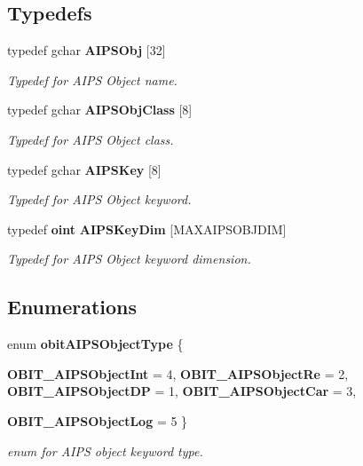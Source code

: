 \subsection*{Typedefs}
\begin{CompactItemize}
\item 
typedef gchar {\bf AIPSObj} [32]
\begin{CompactList}\small\item\em Typedef for AIPS Object name. \item\end{CompactList}\item 
typedef gchar {\bf AIPSObj\-Class} [8]
\begin{CompactList}\small\item\em Typedef for AIPS Object class. \item\end{CompactList}\item 
typedef gchar {\bf AIPSKey} [8]
\begin{CompactList}\small\item\em Typedef for AIPS Object keyword. \item\end{CompactList}\item 
typedef {\bf oint} {\bf AIPSKey\-Dim} [MAXAIPSOBJDIM]
\begin{CompactList}\small\item\em Typedef for AIPS Object keyword dimension. \item\end{CompactList}\end{CompactItemize}
\subsection*{Enumerations}
\begin{CompactItemize}
\item 
enum {\bf obit\-AIPSObject\-Type} \{ \par
{\bf OBIT\_\-AIPSObject\-Int} =  4, 
{\bf OBIT\_\-AIPSObject\-Re} =  2, 
{\bf OBIT\_\-AIPSObject\-DP} =  1, 
{\bf OBIT\_\-AIPSObject\-Car} =  3, 
\par
{\bf OBIT\_\-AIPSObject\-Log} =  5
 \}
\begin{CompactList}\small\item\em enum for AIPS object keyword type. \item\end{CompactList}\end{CompactItemize}
